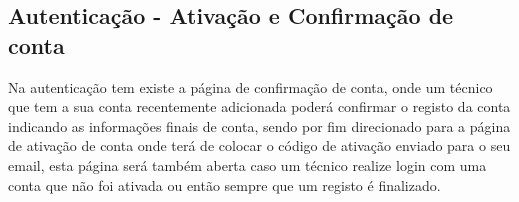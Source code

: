 \newpage

\subsection{Autenticação - Ativação e Confirmação de conta}

Na autenticação tem existe a página de confirmação de conta, onde um técnico que tem a sua conta recentemente adicionada poderá
confirmar o registo da conta indicando as informações finais de conta, sendo por fim direcionado para a página
de ativação de conta onde terá de colocar o código de ativação enviado para o seu email, esta página será também aberta 
caso um técnico realize login com uma conta que não foi ativada ou então sempre que um registo é finalizado.

\begin{figure}[htb]%
    \centering
    \qquad

\end{figure}
